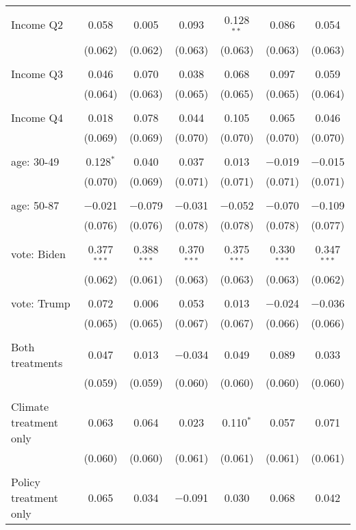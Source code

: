 \begin{tabular}{@{\extracolsep{5pt}}lcccccc}
  & & & & & & \\ 
 Income Q2 & 0.058 & 0.005 & 0.093 & 0.128$^{**}$ & 0.086 & 0.054 \\ 
  & (0.062) & (0.062) & (0.063) & (0.063) & (0.063) & (0.063) \\ 
  & & & & & & \\ 
 Income Q3 & 0.046 & 0.070 & 0.038 & 0.068 & 0.097 & 0.059 \\ 
  & (0.064) & (0.063) & (0.065) & (0.065) & (0.065) & (0.064) \\ 
  & & & & & & \\ 
 Income Q4 & 0.018 & 0.078 & 0.044 & 0.105 & 0.065 & 0.046 \\ 
  & (0.069) & (0.069) & (0.070) & (0.070) & (0.070) & (0.070) \\ 
  & & & & & & \\ 
 age: 30-49 & 0.128$^{*}$ & 0.040 & 0.037 & 0.013 & $-$0.019 & $-$0.015 \\ 
  & (0.070) & (0.069) & (0.071) & (0.071) & (0.071) & (0.071) \\ 
  & & & & & & \\ 
 age: 50-87 & $-$0.021 & $-$0.079 & $-$0.031 & $-$0.052 & $-$0.070 & $-$0.109 \\ 
  & (0.076) & (0.076) & (0.078) & (0.078) & (0.078) & (0.077) \\ 
  & & & & & & \\ 
 vote: Biden & 0.377$^{***}$ & 0.388$^{***}$ & 0.370$^{***}$ & 0.375$^{***}$ & 0.330$^{***}$ & 0.347$^{***}$ \\ 
  & (0.062) & (0.061) & (0.063) & (0.063) & (0.063) & (0.062) \\ 
  & & & & & & \\ 
 vote: Trump & 0.072 & 0.006 & 0.053 & 0.013 & $-$0.024 & $-$0.036 \\ 
  & (0.065) & (0.065) & (0.067) & (0.067) & (0.066) & (0.066) \\ 
  & & & & & & \\ 
 Both treatments & 0.047 & 0.013 & $-$0.034 & 0.049 & 0.089 & 0.033 \\ 
  & (0.059) & (0.059) & (0.060) & (0.060) & (0.060) & (0.060) \\ 
  & & & & & & \\ 
 Climate treatment only & 0.063 & 0.064 & 0.023 & 0.110$^{*}$ & 0.057 & 0.071 \\ 
  & (0.060) & (0.060) & (0.061) & (0.061) & (0.061) & (0.061) \\ 
  & & & & & & \\ 
 Policy treatment only & 0.065 & 0.034 & $-$0.091 & 0.030 & 0.068 & 0.042 \\ 

\end{tabular}
